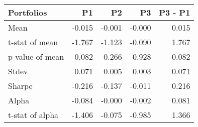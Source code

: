 \begin{tabular}{lrrrr}
\toprule
Portfolios & P1 & P2 & P3 & P3 - P1 \\
\midrule
Mean & -0.015 & -0.001 & -0.000 & 0.015 \\
t-stat of mean & -1.767 & -1.123 & -0.090 & 1.767 \\
p-value of mean & 0.082 & 0.266 & 0.928 & 0.082 \\
Stdev & 0.071 & 0.005 & 0.003 & 0.071 \\
Sharpe & -0.216 & -0.137 & -0.011 & 0.216 \\
Alpha & -0.084 & -0.000 & -0.002 & 0.081 \\
t-stat of alpha & -1.406 & -0.075 & -0.985 & 1.366 \\
\bottomrule
\end{tabular}
